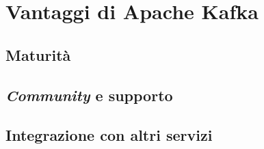 \section{Vantaggi di Apache Kafka}
\subsection{Maturità}
\subsection{\textit{Community} e supporto}
\subsection{Integrazione con altri servizi}

